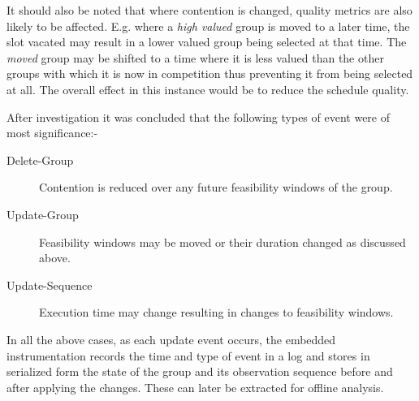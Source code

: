 It should also be noted that where contention is changed, quality metrics are also likely to be affected. E.g. where a \emph{high valued} group is moved to a later time, the slot vacated may result in a lower valued group being selected at that time. The \emph{moved} group may be shifted to a time where it is less valued than the other groups with which it is now in competition thus preventing it from being selected at all. The overall effect in this instance would be to reduce the schedule quality.

After investigation it was concluded that the following types of event were of most significance:-
\begin{description}
\item [Delete-Group] Contention is reduced over any future feasibility windows of the group.
\item [Update-Group] Feasibility windows may be moved or their duration changed as discussed above. 
\item [Update-Sequence] Execution time may change resulting in changes to feasibility windows. 
\end{description}

In all the above cases, as each update event occurs, the embedded instrumentation records the time and type of event in a log and stores in serialized form the state of the group and its observation sequence before and after applying the changes. These can later be extracted for offline analysis.



